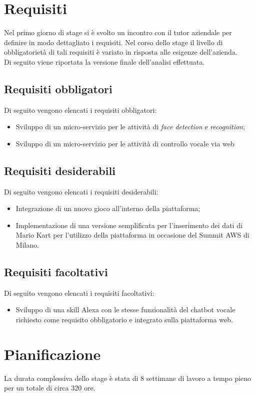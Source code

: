 \section{Requisiti}
Nel primo giorno di stage si è svolto un incontro con il tutor aziendale per definire in modo dettagliato i requisiti. Nel corso dello stage il livello di obbligatorietà di tali requisiti è variato in risposta alle esigenze dell'azienda. \\
 Di seguito viene riportata la versione finale dell'analisi effettuata.

	\subsection{Requisiti obbligatori}
		Di seguito vengono elencati i requisiti obbligatori:
		\begin{itemize}
			\item Sviluppo di un micro-servizio per le attività di \emph{face detection} e \emph{recognition};
			\item Sviluppo di un micro-servizio per le attività di controllo vocale via web
		\end{itemize}
	\subsection{Requisiti desiderabili}
		Di seguito vengono elencati i requisiti desiderabili:
		\begin{itemize}
			\item Integrazione di un nuovo gioco all'interno della piattaforma;
			\item Implementazione di una versione semplificata per l'inserimento dei dati di Mario Kart per l'utilizzo
			della piattaforma in occasione del Summit \gls{AWS} di Milano.
		\end{itemize}
	\subsection{Requisiti facoltativi}
		Di seguito vengono elencati i requisiti facoltativi:
		\begin{itemize}
			\item Sviluppo di una \gls{skill} Alexa con le stesse funzionalità del \gls{chatbot} vocale richiesto come requisito obbligatorio e integrato sulla piattaforma web.
		\end{itemize}

\section{Pianificazione}
La durata complessiva dello stage è stata di 8 settimane di lavoro a tempo pieno per un totale di circa 320 ore. \\

